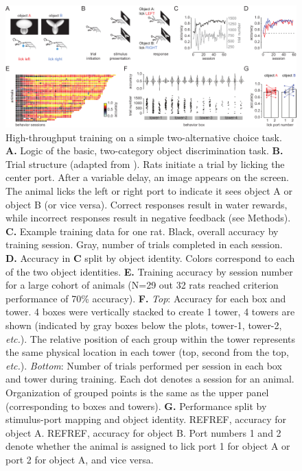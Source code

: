 \begin{figure}[t!]
    \includegraphics[width=\textwidth]{figures/chapter_1/fig_1-2_basic_training/fig_1-2_basic_training.pdf}
    \vspace{.1in}
    \caption[High-throughput training]{High-throughput training on a simple two-alternative choice task. 
    \textbf{A.} Logic of the basic, two-category object discrimination task. 
    \textbf{B.} Trial structure (adapted from \cite{Zoccolan2009}). Rats initiate a trial by licking the center port. After a variable delay, an image appears on the screen. The animal licks the left or right port to indicate it sees object A or object B (or vice versa). Correct responses result in water rewards, while incorrect responses result in negative feedback (see Methods). 
    \textbf{C.} Example training data for one rat. Black, overall accuracy by training session. Gray, number of trials completed in each session. 
    \textbf{D.} Accuracy in \textbf{C} split by object identity. Colors correspond to each of the two object identities.
    \textbf{E.} Training accuracy by session number for a large cohort of animals (N=29 out 32 rats reached criterion performance of 70\% accuracy). 
    \textbf{F.} \textit{Top}: Accuracy for each box and tower. 4 boxes were vertically stacked to create 1 tower, 4 towers are shown (indicated by gray boxes below the plots, tower-1, tower-2, \textit{etc.}). The relative position of each group within the tower represents the same physical location in each tower (top, second from the top, \textit{etc.}). \textit{Bottom}: Number of trials performed per session in each box and tower during training. Each dot denotes a session for an animal. Organization of grouped points is the same as the upper panel (corresponding to boxes and towers). 
    \textbf{G.} Performance split by stimulus-port mapping and object identity. REFREF, accuracy for object A. REFREF, accuracy for object B. Port numbers 1 and 2 denote whether the animal is assigned to lick port 1 for object A or port 2 for object A, and vice versa.
    \label{fig:basic_training}}
\end{figure}

